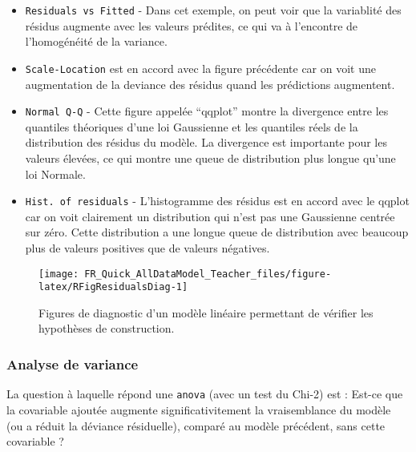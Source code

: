 \documentclass[french,a4paper]{article}
\providecommand{\tightlist}{%
  \setlength{\itemsep}{0pt}\setlength{\parskip}{0pt}}
\begin{document}
\begin{itemize}
\tightlist
\item
  \texttt{Residuals\ vs\ Fitted} - Dans cet exemple, on peut voir que la
  variablité des résidus augmente avec les valeurs prédites, ce qui va à
  l'encontre de l'homogénéité de la variance.
\item
  \texttt{Scale-Location} est en accord avec la figure précédente car on
  voit une augmentation de la deviance des résidus quand les prédictions
  augmentent.
\item
  \texttt{Normal\ Q-Q} - Cette figure appelée ``qqplot'' montre la
  divergence entre les quantiles théoriques d'une loi Gaussienne et les
  quantiles réels de la distribution des résidus du modèle. La
  divergence est importante pour les valeurs élevées, ce qui montre une
  queue de distribution plus longue qu'une loi Normale.
\item
  \texttt{Hist.\ of\ residuals} - L'histogramme des résidus est en
  accord avec le qqplot car on voit clairement un distribution qui n'est
  pas une Gaussienne centrée sur zéro. Cette distribution a une longue
  queue de distribution avec beaucoup plus de valeurs positives que de
  valeurs négatives.
\end{itemize}




\begin{figure}[!h]

{\centering \texttt{[image: FR\_Quick\_AllDataModel\_Teacher\_files/figure-latex/RFigResidualsDiag-1]} 

}

\caption{Figures de diagnostic d'un modèle linéaire
permettant de vérifier les hypothèses de construction.}\label{fig:RFigResidualsDiag}
\end{figure}

\subsubsection{Analyse de variance}\label{analyse-de-variance}

La question à laquelle répond une \texttt{anova} (avec un test du Chi-2)
est : Est-ce que la covariable ajoutée augmente significativitement la
vraisemblance du modèle (ou a réduit la déviance résiduelle), comparé au
modèle précédent, sans cette covariable ?
\end{document}
